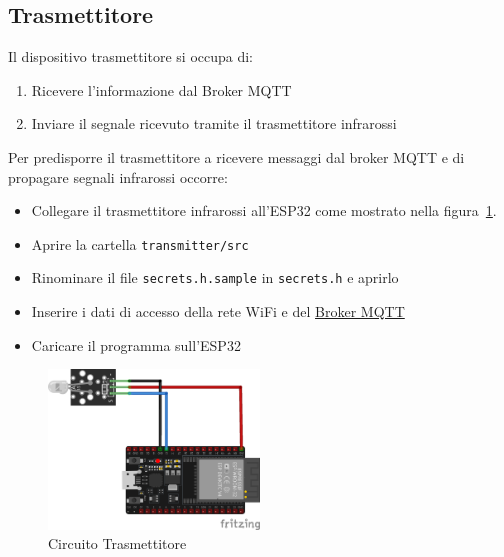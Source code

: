 \documentclass[a4paper,11pt]{article}
\begin{document}
    \subsection{Trasmettitore}
    \label{subsec:transmitter}

    Il dispositivo trasmettitore si occupa di:

    \begin{enumerate}
      \item Ricevere l'informazione dal Broker MQTT
      \item Inviare il segnale ricevuto tramite il trasmettitore infrarossi
    \end{enumerate}

    Per predisporre il trasmettitore a ricevere messaggi dal broker MQTT e di propagare segnali infrarossi occorre:

    \begin{itemize}
      \item Collegare il trasmettitore infrarossi all'ESP32 come mostrato nella figura~\ref{fig:circuito_trasmettitore}.

          
      \item Aprire la cartella \texttt{transmitter/src}
      \item Rinominare il file \texttt{secrets.h.sample} in \texttt{secrets.h} e aprirlo
      \item Inserire i dati di accesso della rete WiFi e del \hyperref[subsec:Broker]{Broker MQTT}
      \item Caricare il programma sull'ESP32
    \end{itemize}

    \begin{figure}[H]
      \centering
      \includegraphics[width=0.5\textwidth,height=\textheight,keepaspectratio]{assets/transmitter_fritzing}
      \caption{Circuito Trasmettitore}
      \label{fig:circuito_trasmettitore}
    \end{figure}
\end{document}
